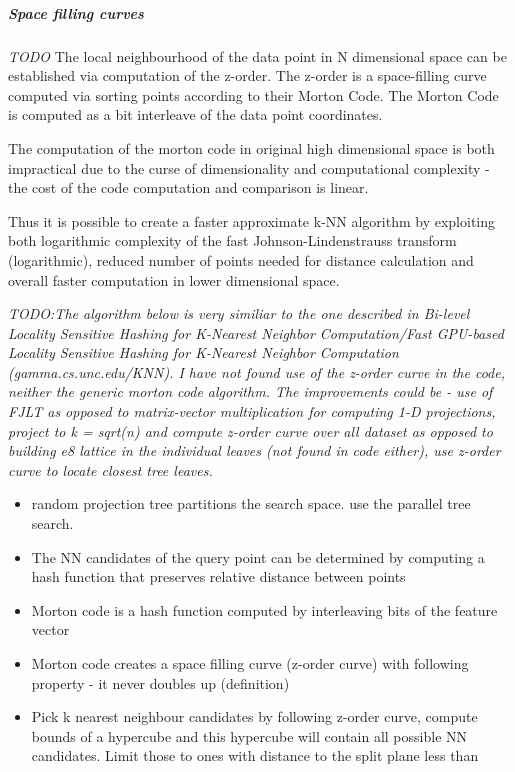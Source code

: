 \subparagraph*{Space filling curves}
\textit{TODO}
The local neighbourhood of the data point in N dimensional space can be
established via computation of the z-order. The z-order is a space-filling curve computed via sorting points according to their Morton Code. The Morton Code is computed as a bit interleave of the data point coordinates.

The computation of the morton code in original high dimensional space is both impractical due to the curse of dimensionality and  computational complexity - the cost of the code computation and comparison is linear.

Thus it is possible to create a faster approximate k-NN algorithm by exploiting both logarithmic complexity of the fast Johnson-Lindenstrauss transform (logarithmic), reduced number of points needed for distance calculation and overall faster computation in lower dimensional space.  

\textit{TODO:The algorithm below is very similiar to the one described in 
Bi-level Locality Sensitive Hashing for K-Nearest Neighbor Computation/Fast
GPU-based Locality Sensitive Hashing for K-Nearest Neighbor Computation
(gamma.cs.unc.edu/KNN). I have not found use of the z-order curve in the code,
neither the generic morton code algorithm. The improvements could be - use of FJLT as opposed to matrix-vector
multiplication for computing 1-D projections, project to k = sqrt(n) and compute
z-order curve over all dataset as opposed to building e8 lattice in the
individual leaves (not found in code either), use z-order curve to locate
closest tree leaves. }

\begin{itemize}
\item random projection tree partitions the search space. use the parallel tree
search.
\item The NN candidates of the query point can be determined by computing a hash function that preserves relative distance between points
\item Morton code is a hash function computed by interleaving bits of the feature vector
\item Morton code creates a space filling curve (z-order curve) with following property - it never doubles up (definition)
\item Pick k nearest neighbour candidates by following z-order curve, compute bounds of a hypercube and this hypercube will contain all possible NN candidates.
Limit those to ones with distance to the split plane less than 
\end{itemize} 

